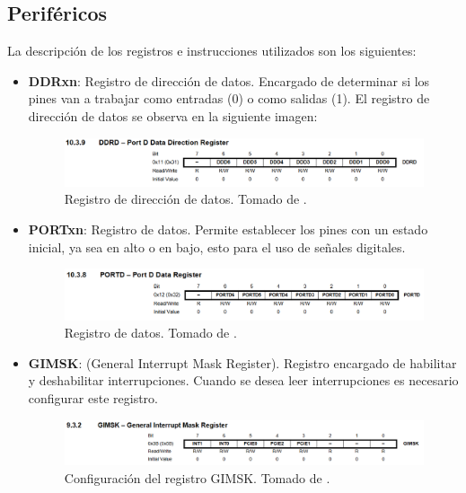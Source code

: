\subsection*{Periféricos}
La descripción de los registros e instrucciones utilizados son los siguientes:
\begin{itemize}
    \item \textbf{DDRxn}: Registro de dirección de datos. Encargado de determinar si los pines van a trabajar como entradas (0) o como salidas (1). El registro de dirección de datos se observa en la siguiente imagen:
    \begin{figure}[H]
        \centering
        \includegraphics[width=.9\linewidth]{informe/Carpeta tex/Imagenes/DirectionD.png}
        \caption{Registro de dirección de datos. Tomado de \cite{web}.}
        \label{fig4}
    \end{figure}
    
	\item \textbf{PORTxn}: Registro de datos. Permite establecer los pines con un estado inicial, ya sea en alto o en bajo, esto para el uso de señales digitales.
    \begin{figure}[H]
        \centering
        \includegraphics[width=.9\linewidth]{informe/Carpeta tex/Imagenes/DataD.png}
        \caption{Registro de datos. Tomado de \cite{web}.}
        \label{fig5}
    \end{figure}

    \item \textbf{GIMSK}: (General Interrupt Mask Register). Registro encargado de habilitar y deshabilitar interrupciones. Cuando se desea leer interrupciones es necesario configurar este registro.
    \begin{figure}[H]
        \centering
        \includegraphics[width=.9\linewidth]{informe/Carpeta tex/Imagenes/GIMSK.png}
        \caption{Configuración del registro GIMSK. Tomado de \cite{web}.}
        \label{fig6}
    \end{figure}


\end{itemize}
